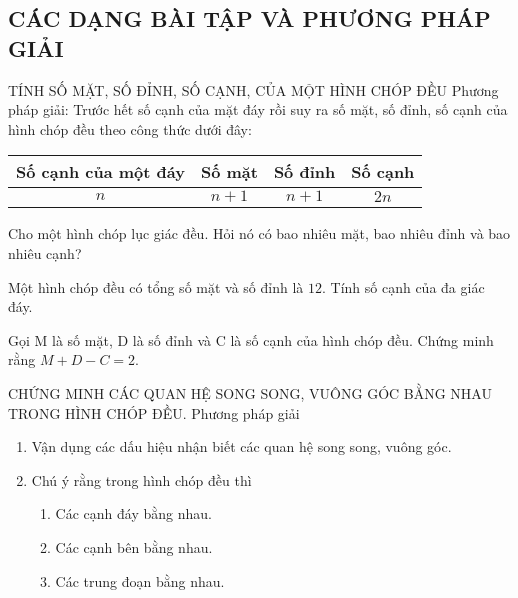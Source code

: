\subsection{CÁC DẠNG BÀI TẬP VÀ PHƯƠNG PHÁP GIẢI}
\begin{dang}{TÍNH SỐ MẶT, SỐ ĐỈNH, SỐ CẠNH, CỦA MỘT HÌNH CHÓP ĐỀU}
Phương pháp giải: Trước hết số cạnh của mặt đáy rồi suy ra số mặt, số đỉnh, số cạnh của hình chóp đều theo công thức dưới đây:\\
\begin{center}
\begin{tabular}{|c|c|c|c|}
\hline 
Số cạnh của một đáy & Số mặt & Số đỉnh &Số cạnh\\ 
\hline 
$n$ & $n+1$ & $n+1$& $2n$\\ 
\hline 
\end{tabular}
\end{center}
\hfill
\end{dang}
\begin{vd}%
Cho một hình chóp lục giác đều. Hỏi nó có bao nhiêu mặt, bao nhiêu đỉnh và bao nhiêu cạnh?
\end{vd}
\begin{vd}%
Một hình chóp đều có tổng số mặt và số đỉnh là $12$. Tính số cạnh của đa giác đáy.
\end{vd}
\begin{vd}%
Gọi M là số mặt, D là số đỉnh và C là số cạnh của hình chóp đều. Chứng minh rằng $M+D-C=2$.
\end{vd}
\begin{dang}{CHỨNG MINH CÁC QUAN HỆ SONG SONG, VUÔNG GÓC BẰNG NHAU TRONG HÌNH CHÓP ĐỀU.}
Phương pháp giải
\begin{enumerate}[*]
\item Vận dụng các dấu hiệu nhận biết các quan hệ song song, vuông góc.
\item  Chú ý rằng trong hình chóp đều thì
\begin{enumerate}[-]
\item Các cạnh đáy bằng nhau.
\item Các cạnh bên bằng nhau.
\item Các trung đoạn bằng nhau.
\end{enumerate}
\end{enumerate}
\end{dang}
